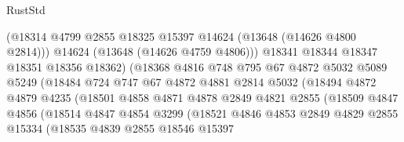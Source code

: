 \begin{lexlean}{RustStd}
\begin{coremodule}
                                (@18314
                                  @4799
                                  @2855
                                  @18325
                                  @15397
                                  @14624
                                  (@13648 (@14626 @4800 @2814)))
                                @14624
                                (@13648 (@14626 @4759 @4806)))
                              @18341
                              @18344
                              @18347
                              @18351
                              @18356
                              @18362)
                            (@18368
                              @4816
                              @748
                              @795
                              @67
                              @4872
                              @5032
                              @5089
                              @5249
                              (@18484
                                @724
                                @747
                                @67
                                @4872
                                @4881
                                @2814
                                @5032
                                (@18494
                                  @4872
                                  @4879
                                  @4235
                                  (@18501
                                    @4858
                                    @4871
                                    @4878
                                    @2849
                                    @4821
                                    @2855
                                    (@18509
                                      @4847
                                      @4856
                                      (@18514
                                        @4847
                                        @4854
                                        @3299
                                        (@18521
                                          @4846
                                          @4853
                                          @2849
                                          @4829
                                          @2855
                                          @15334
                                          (@18535
                                            @4839
                                            @2855
                                            @18546
                                            @15397

\end{coremodule}
\end{lexlean}
